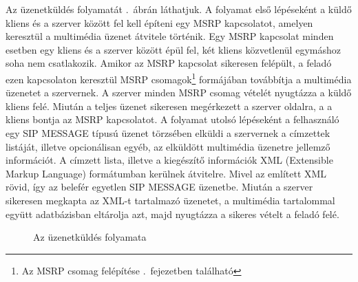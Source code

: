 Az üzenetküldés folyamatát .~ábrán láthatjuk. A folyamat első lépéseként a küldő kliens és a szerver között fel kell építeni egy MSRP kapcsolatot, amelyen keresztül a multimédia üzenet átvitele történik. Egy MSRP kapcsolat minden esetben egy kliens és a szerver között épül fel, két kliens közvetlenül egymáshoz soha nem csatlakozik. Amikor az MSRP kapcsolat sikeresen felépült, a feladó ezen kapcsolaton keresztül MSRP csomagok\footnote{Az MSRP csomag felépítése .~fejezetben található} formájában továbbítja a multimédia üzenetet a szervernek. A szerver minden MSRP csomag vételét nyugtázza a küldő kliens felé. Miután a teljes üzenet sikeresen megérkezett a szerver oldalra, a a kliens bontja az MSRP kapcsolatot. A folyamat utolsó lépéseként a felhasználó egy SIP MESSAGE típusú üzenet törzsében elküldi a szervernek a címzettek listáját, illetve opcionálisan egyéb, az elküldött multimédia üzenetre jellemző információt. A címzett lista, illetve a kiegészítő információk XML (Extensible Markup Language) formátumban kerülnek átvitelre. Mivel az említett XML rövid, így az belefér egyetlen SIP MESSAGE üzenetbe. Miután a szerver sikeresen megkapta az XML-t tartalmazó üzenetet, a multimédia tartalommal együtt adatbázisban eltárolja azt, majd nyugtázza a sikeres vételt a feladó felé.

\begin{figure}[htbp]
\center
{}
\caption{Az üzenetküldés folyamata}
\label{fig:sending_proc}
\end{figure}

